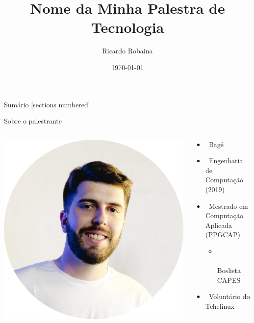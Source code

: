 \documentclass[aspectratio=1610]{beamer}
\institute{Nome do Evento (2019)}
\title{Nome da Minha Palestra de Tecnologia}
\author{Ricardo Robaina}
\date{\today}
\begin{document}
	
	\begin{frame}{}
		\titlepage
		\thispagestyle{empty}
	\end{frame}
	
	\begin{frame}{Sumário}
		[sections numbered]
		\tableofcontents[hideallsubsections]
	\end{frame}

	\begin{frame}{Sobre o palestrante}
	
		\begin{columns}
			
			\begin{column}{0.3\textwidth}
				\includegraphics[scale = 0.17]{fig/fig_eu.png}
			\end{column}
		
			\begin{column}{0.7\textwidth}  %
				\textbf{\insertauthor}
				\begin{itemize}
					\item \faMapMarker \ Bagé
					\item \faMortarBoard \ Engenharia de Computação (2019)
					\item \faMortarBoard \ Mestrado em Computação Aplicada (PPGCAP)
						\begin{itemize}
							\item \small{\\\\Boslista CAPES}
						\end{itemize}
					\item \faLinux \ Voluntário do Tchelinux
				\end{itemize}
			\end{column}
		\end{columns}
	

\end{frame}
\end{document}
